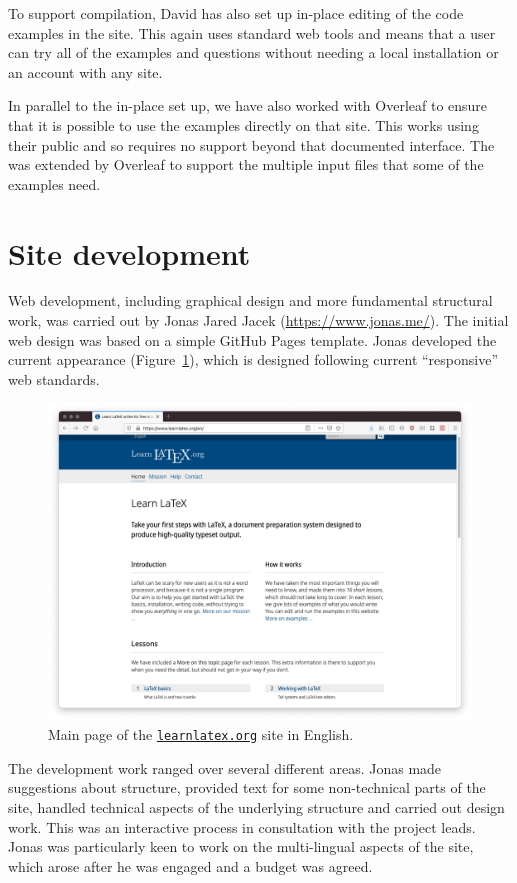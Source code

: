 \documentclass[a4paper]{article}
\begin{document}
To support compilation, David has also set up in-place editing of the code
examples in the site. This again uses standard web tools and means that a user
can try all of the examples and questions without needing a local installation
or an account with any site.

In parallel to the in-place set up, we have also worked with Overleaf to ensure
that it is possible to use the examples directly on that site. This works using
their public  and so requires no support beyond that documented
interface. The  was extended by Overleaf to support the multiple
input files that some of the examples need. 

\section{Site development}

Web development, including graphical design and more fundamental structural
work, was carried out by Jonas Jared Jacek (\url{https://www.jonas.me/}). The
initial web design was based on a simple GitHub Pages template. Jonas developed
the current appearance (Figure~\ref{fgr:site}), which is designed following
current \enquote{responsive} web standards.
\begin{figure}
  \includegraphics[width = \textwidth]{learnlatex-screenshot}
  \caption{Main page of the \href{https://learnlatex.org}{\nolinkurl{learnlatex.org}} site in English.\label{fgr:site}}
\end{figure}

The development work ranged over several different areas. Jonas made
suggestions about structure, provided text for some non-technical parts of the
site, handled technical aspects of the underlying structure and carried out
design work. This was an interactive process in consultation with the project
leads. Jonas was particularly keen to work on the multi-lingual aspects of
the site, which arose after he was engaged and a budget was agreed.
\end{document}

